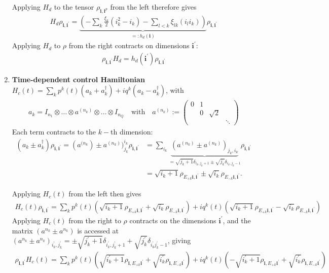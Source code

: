 \documentclass[letterpaper]{article}
\newcommand{\bfi}{\boldsymbol{i}}
\newcommand{\p}{\prime}
\begin{document}
\begin{enumerate}
      Applying $H_d$ to the tensor $\rho_{\bfi, \bfi^p}$ from the left therefore gives  
      \begin{align}
        H_d \rho_{\bfi, \bfi^\p} = \underbrace{\left(-\sum_k \frac{\xi_k}{2}(i_k^2 - i_k) - \sum_{l<k} \xi_{lk} (i_l i_k) \right)}_{=:h_d(\bfi)} \rho_{\bfi, \bfi^\p}
      \end{align}
      Applying $H_d$ to $\rho$ from the right contracts on dimensions $\bfi^\prime$:
      \begin{align}
        \rho_{\bfi, \bfi^\p} H_d  = h_d(\bfi^\p) \rho_{\bfi,\bfi^\p}
        \end{align}

    \item \textbf{Time-dependent control Hamiltonian} $H_c(t) = \sum_k p^k(t) (a_k + a_k^\dag) + iq^k(a_k - a_k^\dag)$, with  
      \begin{align}
      a_k = I_{n_1}\otimes \dots \otimes a^{(n_k)} \otimes \dots \otimes I_{n_Q} \quad \text{with} \quad a^{(n_k)} := \begin{pmatrix} 0 & 1 & \\ & 0 & \sqrt{2} \\ & & & \ddots \end{pmatrix}
      \end{align}
      Each term contracts to the $k-$th dimension:
      \begin{align}
        (a_k\pm a_k^\dag) \rho_{\bfi,\bfi^\p} = (a^{(n_k}) \pm a^{(n_k)})^{i_k}_{j_k} \rho_{\bfi,\bfi^\prime} &= \sum_{i_k} \underbrace{(a^{(n_k)} \pm a^{(n_k)})_{j_k,i_k}}_{= \sqrt{j_k+1} \delta_{i_k,j_k+1} \pm \sqrt{j_k} \delta_{i_k,j_k-1}} \rho_{\bfi, \bfi^{\prime}} \\
        &= \sqrt{i_k+1} \rho_{E_{+k}\bfi, \bfi^\prime} \pm \sqrt{i_k} \rho_{E_{-k}\bfi, \bfi^\prime}.
      \end{align} 

      Applying $H_c(t)$ from the left then gives 
      \begin{align}
        H_c(t) \rho_{\bfi, \bfi^\prime} = \sum_k p^k(t) \left(\sqrt{i_k+1} \rho_{E_{+k}\bfi,\bfi^\prime} + \sqrt{i_k} \rho_{E_{-k} \bfi,\bfi^\prime} \right) + iq^k(t) \left(\sqrt{i_k+1} \rho_{E_{+k}\bfi,\bfi^\prime} - \sqrt{i_k} \rho_{E_{-k}\bfi,\bfi^\prime} \right)
      \end{align}
      Applying $H_c(t)$ from the right to $\rho$ contracts on the dimensions $\bfi^\prime$, and the matrix $(a^{n_k } \pm a^{n_k})$ is accessed at $(a^{n_k } \pm a^{n_k})_{i_k^\prime,j_k^\prime} = \pm \sqrt{j_k^\prime+1} \delta_{i_k^\prime, j_k^\prime +1} + \sqrt{j_k^\prime} \delta_{i_k^\prime j_k^\prime -1}$, giving
      \begin{align}
        \rho_{\bfi, \bfi^\prime} H_c(t) = \sum_k p^k(t) \left(\sqrt{i_k^\prime+1} \rho_{\bfi,E_{+k}\bfi^\prime} + \sqrt{i_k^\prime} \rho_{\bfi,E_{-k}\bfi^\prime} \right) + iq^k(t) \left( - \sqrt{i_k^\prime+1} \rho_{\bfi,E_{+k}\bfi^\prime} + \sqrt{i_k^\prime} \rho_{\bfi,E_{-k}\bfi^\prime} \right)
      \end{align}


\end{enumerate}
\end{document}

